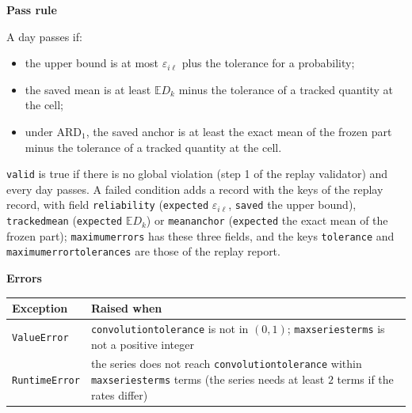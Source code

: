 \documentclass[11pt,a4paper]{article}
\makeatletter
\theoremstyle{plain}
\theoremstyle{definition}
\newcommand{\ARDone}{\mathrm{ARD}_{1}}
\newcommand{\blockhead}[1]{\par\noindent\textbf{#1}\par\nobreak}
\renewcommand{\_}{\textunderscore\allowbreak{}}
\providecommand{\rejrow}[2]{{\raggedright #1\par} & {\raggedright #2\par} \\}
\providecommand{\tabstart}[2]{\begingroup\small\begin{longtable}{@{}#1@{}}\toprule #2 \\ \midrule \endhead}
\providecommand{\tabend}{\bottomrule\end{longtable}\endgroup}
\makeatother
\begin{document}
\blockhead{Pass rule}
A day passes if:
\begin{itemize}[nosep]
  \item the upper bound is at most $\varepsilon_{i\ell}$ plus the tolerance for a probability;
  \item the saved mean is at least $\mathbb{E}D_k$ minus the tolerance of a tracked quantity at the cell;
  \item under $\ARDone$, the saved anchor is at least the exact mean of the frozen part minus the tolerance of a tracked quantity at the cell.
\end{itemize}
\texttt{valid} is true if there is no global violation (step 1 of the replay validator) and every day passes. A failed condition adds a record with the keys of the replay record, with field \texttt{reliability} (\texttt{expected} $\varepsilon_{i\ell}$, \texttt{saved} the upper bound), \texttt{tracked\_mean} (\texttt{expected} $\mathbb{E}D_k$) or \texttt{mean\_anchor} (\texttt{expected} the exact mean of the frozen part); \texttt{maximum\_errors} has these three fields, and the keys \texttt{tolerance} and \texttt{maximum\_error\_tolerances} are those of the replay report.

\blockhead{Errors}
\tabstart{p{3.4cm}p{11.6cm}}{Exception & Raised when}
\rejrow{\texttt{ValueError}}{\texttt{convolution\_tolerance} is not in $(0,1)$; \texttt{max\_series\_terms} is not a positive integer}
\rejrow{\texttt{RuntimeError}}{the series does not reach \texttt{convolution\_tolerance} within \texttt{max\_series\_terms} terms (the series needs at least $2$ terms if the rates differ)}
\tabend
\end{document}
